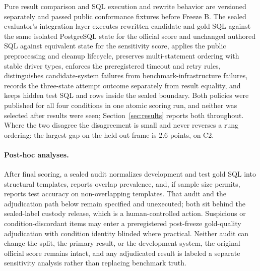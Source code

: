 Pure result comparison and SQL execution and rewrite behavior are versioned
separately and passed public conformance fixtures before Freeze B. The sealed
evaluator's integration layer executes rewritten candidate and gold SQL against
the same isolated PostgreSQL state for the official score and unchanged authored
SQL against equivalent state for the sensitivity score, applies the public
preprocessing and cleanup lifecycle, preserves multi-statement ordering with
stable driver types, enforces the preregistered timeout and retry rules,
distinguishes candidate-system failures from benchmark-infrastructure failures,
records the three-state attempt outcome separately from result equality, and
keeps hidden test SQL and rows inside the sealed boundary. Both policies were
published for all four conditions in one atomic scoring run, and neither was
selected after results were seen; Section~\ref{sec:results} reports both
throughout. Where the two disagree the disagreement is small and never reverses
a rung ordering: the largest gap on the held-out frame is 2.6 points, on C2.

\paragraph{Post-hoc analyses.}
After final scoring, a sealed audit normalizes development and test gold SQL into
structural templates, reports overlap prevalence, and, if sample size permits,
reports test accuracy on non-overlapping templates. That audit and the
adjudication path below remain specified and unexecuted; both sit behind the
sealed-label custody release, which is a human-controlled action. Suspicious or
condition-discordant items may enter a preregistered post-freeze gold-quality
adjudication with condition identity blinded where practical. Neither audit can
change the split, the primary result, or the development system, the original
official score remains intact, and any adjudicated result is labeled a separate
sensitivity analysis rather than replacing benchmark truth.
